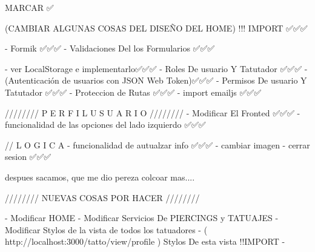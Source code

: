 
MARCAR ✅

(CAMBIAR ALGUNAS COSAS DEL DISEÑO DEL HOME) !!! IMPORT  ✅✅✅

    - Formik ✅✅✅
    - Validaciones Del los Formularios ✅✅✅

    - ver LocalStorage e implementarlo✅✅✅
    - Roles De usuario Y Tatutador ✅✅✅
    - (Autenticación de usuarios con JSON Web Token)✅✅✅
    - Permisos De usuario Y Tatutador ✅✅✅
    - Proteccion de Rutas ✅✅✅
    - import emailjs ✅✅✅



////////   P E R F I L   U S U A R I O   ////////  
    - Modificar El Fronted ✅✅✅
    - funcionalidad de las opciones del lado izquierdo ✅✅✅

    // L O G I C A
    - funcionalidad de autualzar info ✅✅✅
    - cambiar imagen
    - cerrar sesion ✅✅✅

despues sacamos, que me dio pereza colcoar mas....

////////   NUEVAS COSAS POR HACER    ////////  

    - Modificar HOME
    - Modificar Servicios De PIERCINGS y TATUAJES
    - Modificar Stylos de la vista de todos los tatuadores 
    - ( http://localhost:3000/tatto/view/profile )  Stylos De esta vista !!IMPORT
    -


